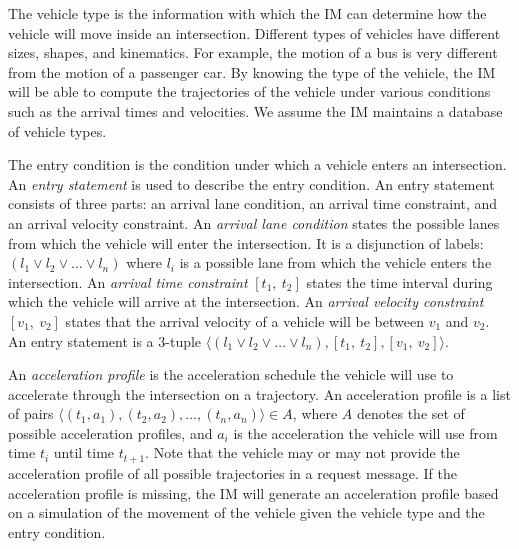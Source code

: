 The vehicle type is the information with which the IM can
determine how the vehicle will move inside an intersection.  Different
types of vehicles have different sizes, shapes, and kinematics.  For
example, the motion of a bus is very different from the motion of a
passenger car.  By knowing the type of the vehicle, the IM will be
able to compute the trajectories of the vehicle under various conditions
such as the arrival times and velocities. We assume the IM maintains
a database of vehicle types.

The entry condition is the condition under which a vehicle enters an
intersection.  An \emph{entry statement} is used to describe the entry
condition. An entry statement consists of three parts: an arrival
lane condition, an arrival time constraint, and an arrival velocity
constraint.  An \emph{arrival lane condition} states the possible lanes
from which the vehicle will enter the intersection.  It is a disjunction of
labels: $(l_1 \vee l_2 \vee \ldots \vee l_n)$ where $l_i$ is a
possible lane from which the vehicle enters the intersection.  An
\emph{arrival time constraint} $[t_1,\ t_2]$ states the time interval
during which the vehicle will arrive at the intersection.  An \emph{arrival
velocity constraint} $[v_1,\ v_2]$ states that the arrival velocity of
a vehicle will be between $v_1$ and $v_2$.  An entry statement is a
$3$-tuple $\langle (l_1 \vee l_2 \vee \ldots \vee l_n), [t_1,\ t_2],
[v_1,\ v_2] \rangle$.

An \emph{acceleration profile} is the acceleration schedule the
vehicle will use to accelerate through the intersection on a
trajectory. An acceleration profile is a list of pairs $\langle (t_1,
a_1), (t_2, a_2), \ldots, (t_n, a_n) \rangle \in A$, where $A$ denotes
the set of possible acceleration profiles, and $a_i$ is the acceleration
the vehicle will use from time $t_i$ until time $t_{t+1}$.  Note that
the vehicle may or may not provide the acceleration profile of all
possible trajectories in a request message.  If the acceleration
profile is missing, the IM will generate an acceleration profile based
on a simulation of the movement of the vehicle given the vehicle type
and the entry condition.


